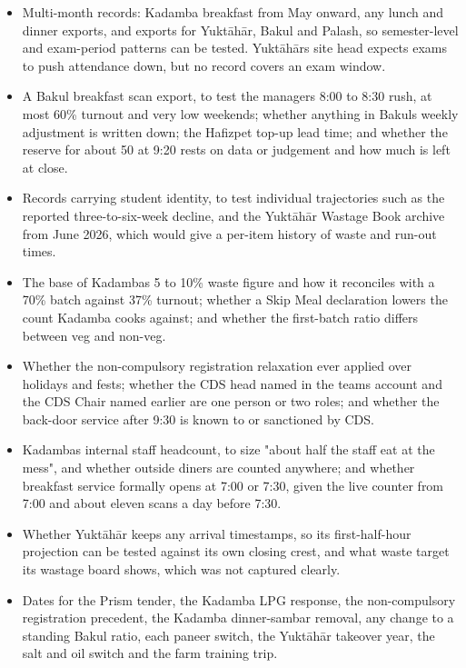 \documentclass[
  10pt,
  table]{article}
\providecommand{\tightlist}{%
  \setlength{\itemsep}{0pt}\setlength{\parskip}{0pt}}
\renewcommand{\tightlist}{\setlength{\itemsep}{1.5pt}\setlength{\parskip}{0pt}}
\begin{document}
\begin{itemize}
\tightlist
\item
  Multi-month records: Kadamba breakfast from May onward, any lunch and dinner exports, and exports for Yuktāhār, Bakul and Palash, so semester-level and exam-period patterns can be tested. Yuktāhār\textquotesingle s site head expects exams to push attendance down, but no record covers an exam window.
\item
  A Bakul breakfast scan export, to test the manager\textquotesingle s 8:00 to 8:30 rush, at most 60\% turnout and very low weekends; whether anything in Bakul\textquotesingle s weekly adjustment is written down; the Hafizpet top-up lead time; and whether the reserve for about 50 at 9:20 rests on data or judgement and how much is left at close.
\item
  Records carrying student identity, to test individual trajectories such as the reported three-to-six-week decline, and the Yuktāhār Wastage Book archive from June 2026, which would give a per-item history of waste and run-out times.
\item
  The base of Kadamba\textquotesingle s 5 to 10\% waste figure and how it reconciles with a 70\% batch against 37\% turnout; whether a Skip Meal declaration lowers the count Kadamba cooks against; and whether the first-batch ratio differs between veg and non-veg.
\item
  Whether the non-compulsory registration relaxation ever applied over holidays and fests; whether the CDS head named in the team\textquotesingle s account and the CDS Chair named earlier are one person or two roles; and whether the back-door service after 9:30 is known to or sanctioned by CDS.
\item
  Kadamba\textquotesingle s internal staff headcount, to size "about half the staff eat at the mess", and whether outside diners are counted anywhere; and whether breakfast service formally opens at 7:00 or 7:30, given the live counter from 7:00 and about eleven scans a day before 7:30.
\item
  Whether Yuktāhār keeps any arrival timestamps, so its first-half-hour projection can be tested against its own closing crest, and what waste target its wastage board shows, which was not captured clearly.
\item
  Dates for the Prism tender, the Kadamba LPG response, the non-compulsory registration precedent, the Kadamba dinner-sambar removal, any change to a standing Bakul ratio, each paneer switch, the Yuktāhār takeover year, the salt and oil switch and the farm training trip.

\end{itemize}
\end{document}
